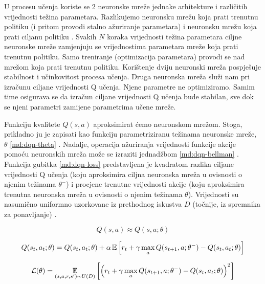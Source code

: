 U procesu učenja koriste se 2 neuronske mreže jednake arhitekture i različitih vrijednosti težina parametara. Razlikujemo neuronsku mrežu koja prati trenutnu politiku (i pritom provodi stalno ažuriranje parametara)  i neuronsku mrežu koja prati ciljanu politiku . Svakih $N$ koraka vrijednosti težina parametara ciljne neuronske mreže zamjenjuju se vrijednostima parametara mreže koja prati trenutnu politiku. Samo treniranje (optimizacija parametara) provodi se nad mrežom koja prati trenutnu politiku. Korištenje dviju neuronski mreža pospješuje stabilnost i učinkovitost procesa učenja. Druga neuronska mreža služi nam pri izračunu ciljane vrijednosti Q učenja. Njene parametre ne optimiziramo. Samim time osigurava se da izračun ciljane vrijednosti Q učenja bude stabilan, sve dok se njeni parametri zamijene parametrima učene mreže.

Funkciju kvalitete $Q(s, a)$ aproksimirat ćemo neuronskom mrežom. Stoga, prikladno ju je zapisati kao funkciju parametriziranu težinama neuronske mreže, $\theta$ \ref{md:dqn-theta} \cite{BruntonYoutube}. Nadalje, operacija ažuriranja vrijednosti funkcije akcije pomoću neuronskih mreža može se izraziti jednadžbom \ref{md:dqn-bellman} \cite{DQN-MlAi}. Funkcija gubitka \ref{md:dqn-loss} predstavljena je kvadratom razlika ciljane vrijednosti Q učenja (koju aproksimira ciljna neuronska mreža u ovisnosti o njenim težinama $\theta^-$) i procjene trenutne vrijednosti akcije (koju aproksimira trenutna neuronska mreža u ovisnosti o njenim težinama $\theta$). Vrijednosti su nasumično uniformno uzorkovane iz prethodnog iskustva $D$ (točnije, iz spremnika za ponavljanje) \cite{DQN-MlAi}.

\begin{equation}
    \label{md:dqn-theta}
    Q(s, a) \approx Q(s, a; \theta)
\end{equation}

\begin{equation}
    \label{md:dqn-bellman}
    Q(s_t, a_t; \theta) = Q(s_t, a_t; \theta) + \alpha \operatorname*{\mathbb{E}} \left[ r_t + \gamma \max_a Q(s_{t+1}, a; \theta^-) - Q(s_t, a_t; \theta) \right]
\end{equation}

\begin{equation}
    \label{md:dqn-loss}
    \mathcal{L}(\theta) = \operatorname*{\mathbb{E}}_{(s,a,r,s') \sim U(D)} \left[ \left( r_t + \gamma \max_a Q(s_{t+1}, a; \theta^-) - Q(s_t, a_t; \theta) \right)^2 \right]
\end{equation}


